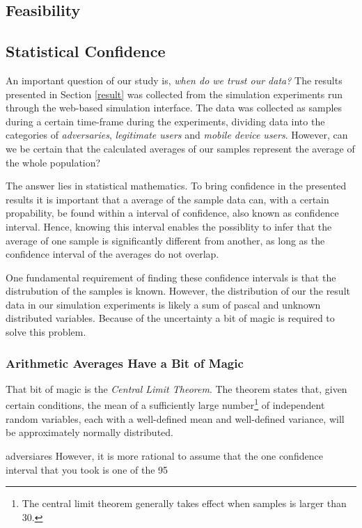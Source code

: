 \subsection{Feasibility}
\subsection{Statistical Confidence}
An important question of our study is, \emph{when do we trust our data?} The results presented in Section \ref{result} was collected from the simulation experiments run through the web-based simulation interface. The data was collected as samples during a certain time-frame during the experiments, dividing data into the categories of \emph{adversaries}, \emph{legitimate users} and \emph{mobile device users}. However,  can we be certain that the calculated averages of our samples represent the average of the whole population?

The answer lies in statistical mathematics. To bring confidence in the presented results it is important that a average of the sample data can, with a certain propability, be found within a interval of confidence, also known as confidence interval. Hence, knowing this interval enables the possiblity to infer that the average of one sample is significantly different from another, as long as the confidence interval of the averages do not overlap.

One fundamental requirement of finding these confidence intervals is that the distrubution of the samples is known. However, the distribution of our the result data in our simulation experiments is likely a sum of pascal and unknown distributed variables. Because of the uncertainty a bit of magic is required to solve this problem. 

\subsubsection{Arithmetic Averages Have a Bit of Magic}
That bit of magic is the \emph{Central Limit Theorem}. The theorem states that, given certain conditions, the mean of a sufficiently large number\footnote{The central limit theorem generally takes effect when samples is larger than 30.} of independent random variables, each with a well-defined mean and well-defined variance, will be approximately normally distributed\cite{gunnar}.


adversiares
However, it is more rational to assume that the one confidence interval that you took is one of the 95%


